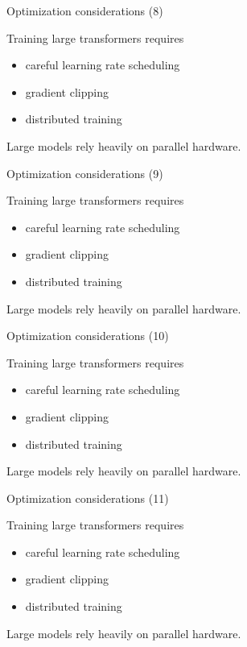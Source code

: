 \documentclass[aspectratio=169]{beamer}
\begin{document}
\begin{frame}{Optimization considerations (8)}

Training large transformers requires

\begin{itemize}
\item careful learning rate scheduling
\item gradient clipping
\item distributed training
\end{itemize}

Large models rely heavily on parallel hardware.

\end{frame}


\begin{frame}{Optimization considerations (9)}

Training large transformers requires

\begin{itemize}
\item careful learning rate scheduling
\item gradient clipping
\item distributed training
\end{itemize}

Large models rely heavily on parallel hardware.

\end{frame}


\begin{frame}{Optimization considerations (10)}

Training large transformers requires

\begin{itemize}
\item careful learning rate scheduling
\item gradient clipping
\item distributed training
\end{itemize}

Large models rely heavily on parallel hardware.

\end{frame}


\begin{frame}{Optimization considerations (11)}

Training large transformers requires

\begin{itemize}
\item careful learning rate scheduling
\item gradient clipping
\item distributed training
\end{itemize}

Large models rely heavily on parallel hardware.

\end{frame}
\end{document}
